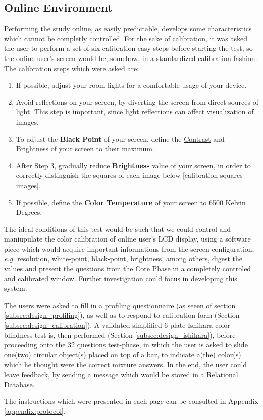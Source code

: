 \subsection{Online Environment}
%
Performing the study online, as easily predictable, develops some characteristics which cannot be completly controlled. For the sake of calibration, it was asked the user
to perform a set of six calibration easy steps before starting the test, so the online user's screen would be,
somehow, in a standardized calibration fashion. The calibration steps which were asked are:
%
\begin{enumerate}
  \item If possible, adjust your room lights for a comfortable usage of your device.
  \item Avoid reflections on your screen, by diverting the screen from direct sources of light. This step is important,
  since light reflections can affect visualization of images.
  \item To adjust the \textbf{Black Point} of your screen, define the \ul{Contrast} and \ul{Brightness} of your screen to their maximum.
  \item After Step 3, gradually reduce \textbf{Brightness} value of your screen, in order to correctly distinguish the squares of each image below [calibration squares images].
  \item If possible, define the \textbf{Color Temperature} of your screen to 6500 Kelvin Degrees.
\end{enumerate} \par
%
The ideal conditions of this test would be such that we could control and maniupulate the color calibration of online user's LCD display, using a software
piece which would acquire important informations from the screen configuration, \emph{e.g.} resolution, white-point, black-point, brightness, among others,
digest the values and present the questions from the Core Phase in a completely controled and calibrated window. Further investigation could focus in
developing this system. \par
%
The users were asked to fill in a profiling questionnaire (as seeen of section \ref{subsec:design_profiling}), as well as to respond to calibration form
(Section \ref{subsec:design_calibration}). A validated simplified 6-plate Ishihara color blindness test \cite{Alwis1992} is, then performed
(Section \ref{subsec:design_ishihara}), before proceeding onto the 32 questions test-phase, in which the user is asked to slide one(two) circular
object(s) placed on top of a bar, to indicate a(the) color(s) which he thought were the correct mixture answers. In the end, the user could leave
feedback, by sending a message which would be stored in a Relational Database. \par
%
The instructions which were presented in each page can be consulted in Appendix \ref{appendix:protocol}.
%
